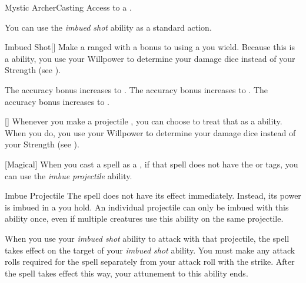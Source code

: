     \begin{feat}{Mystic Archer}{Casting}
        \featpre Access to a .

         You can use the \textit{imbued shot} ability as a standard action.
        \begin{activeability}{Imbued Shot}[]
            \rankline
            Make a ranged  with a  bonus to  using a  you wield.
            Because this is a  ability, you use your Willpower to determine your damage dice instead of your Strength (see ).

            \rankline
             The accuracy bonus increases to .
             The accuracy bonus increases to .
             The accuracy bonus increases to .
        \end{activeability}

        [] Whenever you make a projectile , you can choose to treat that as a  ability.
        When you do, you use your Willpower to determine your damage dice instead of your Strength (see ).

        [Magical] When you cast a spell as a , if that spell does not have the  or  tags,
            you can use the \textit{imbue projectile} ability.
        \begin{attuneability}{Imbue Projectile}{}
            \rankline
            The spell does not have its effect immediately.
            Instead, its power is imbued in a  you hold.
            An individual projectile can only be imbued with this ability once, even if multiple creatures use this ability on the same projectile.

            When you use your \textit{imbued shot} ability to attack with that projectile, the spell takes effect on the target of your \textit{imbued shot} ability.
            You must make any attack rolls required for the spell separately from your attack roll with the strike.
            After the spell takes effect this way, your attunement to this ability ends.
        \end{attuneability}


\end{feat}

